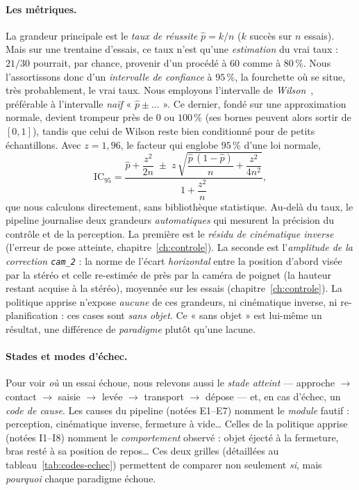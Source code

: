 \paragraph{Les métriques.} La grandeur principale est le \emph{taux de réussite} $\hat{p} = k/n$ ($k$ succès sur $n$ essais). Mais sur une trentaine d'essais, ce taux n'est qu'une \emph{estimation} du vrai taux : $21/30$ pourrait, par chance, provenir d'un procédé à $60$ comme à $80\,\%$. Nous l'assortissons donc d'un \emph{intervalle de confiance} à $95\,\%$, la fourchette où se situe, très probablement, le vrai taux. Nous employons l'intervalle de \emph{Wilson}~\cite{wilson_probable_1927}, préférable à l'intervalle \emph{naïf} « $\hat{p} \pm \ldots$ ». Ce dernier, fondé sur une approximation normale, devient trompeur près de $0$ ou $100\,\%$ (ses bornes peuvent alors sortir de $[0, 1]$), tandis que celui de Wilson reste bien conditionné pour de petits échantillons. Avec $z = 1{,}96$, le facteur qui englobe $95\,\%$ d'une loi normale,
\[
  \text{IC}_{95} = \frac{\hat{p} + \dfrac{z^2}{2n} \;\pm\; z\,\sqrt{\dfrac{\hat{p}\,(1-\hat{p})}{n} + \dfrac{z^2}{4n^2}}}{1 + \dfrac{z^2}{n}} ,
\]
que nous calculons directement, sans bibliothèque statistique. Au-delà du taux, le pipeline journalise deux grandeurs \emph{automatiques} qui mesurent la précision du contrôle et de la perception. La première est le \emph{résidu de cinématique inverse} (l'erreur de pose atteinte, chapitre~\ref{ch:controle}). La seconde est l'\emph{amplitude de la correction \texttt{cam\_2}} : la norme de l'écart \emph{horizontal} entre la position d'abord visée par la stéréo et celle re-estimée de près par la caméra de poignet (la hauteur restant acquise à la stéréo), moyennée sur les essais (chapitre~\ref{ch:controle}). La politique apprise n'expose \emph{aucune} de ces grandeurs, ni cinématique inverse, ni re-planification : ces cases sont \emph{sans objet}. Ce « sans objet » est lui-même un résultat, une différence de \emph{paradigme} plutôt qu'une lacune.

\paragraph{Stades et modes d'échec.} Pour voir \emph{où} un essai échoue, nous relevons aussi le \emph{stade atteint} --- approche $\to$ contact $\to$ saisie $\to$ levée $\to$ transport $\to$ dépose --- et, en cas d'échec, un \emph{code de cause}. Les causes du pipeline (notées E1--E7) nomment le \emph{module} fautif : perception, cinématique inverse, fermeture à vide\ldots{} Celles de la politique apprise (notées I1--I8) nomment le \emph{comportement} observé : objet éjecté à la fermeture, bras resté à sa position de repos\ldots{} Ces deux grilles (détaillées au tableau~\ref{tab:codes-echec}) permettent de comparer non seulement \emph{si}, mais \emph{pourquoi} chaque paradigme échoue.

